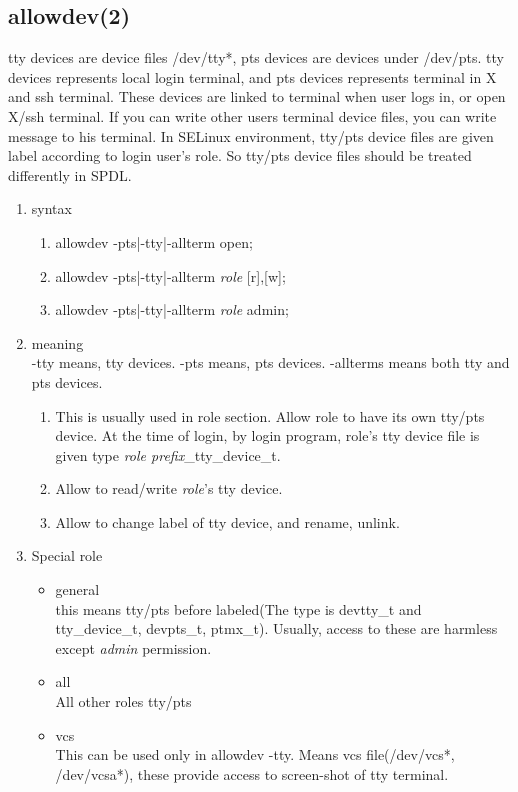 \documentclass{article}
\begin{document}
\subsection{allowdev(2)}
tty devices are device files /dev/tty*, pts devices are devices under
/dev/pts. tty devices represents local login terminal, and pts devices
represents terminal in X and ssh terminal. These devices are linked to
terminal when user logs in, or open X/ssh terminal. If you can write
other users terminal device files, you can write message to his
terminal. 
In SELinux environment, tty/pts device files are given label according to
login user's role. 
So tty/pts device files should be treated differently in SPDL.

\begin{enumerate}
 \item syntax
      \begin{enumerate}
       \item allowdev -pts|-tty|-allterm open;
       \item allowdev -pts|-tty|-allterm {\it role} [r],[w];  
       \item allowdev -pts|-tty|-allterm {\it role} admin;
      \end{enumerate}
 \item meaning\\
       -tty means, tty devices. -pts means, pts devices. -allterms means
       both tty and pts devices.
       \begin{enumerate}
	\item This is usually used in role section. Allow role to have
	      its own tty/pts device. At the time of login, by login
	      program, role's tty device file is given type {\it {\it role prefix}}\_tty\_device\_t. 
	\item  Allow to read/write {\it {\it role}}'s tty
	      device. 
	\item Allow to change label of tty device, and rename, unlink.
       \end{enumerate}
       \item Special role\\
       \begin{itemize}
	\item general\\
	      this means tty/pts before labeled(The type is devtty\_t
	      and tty\_device\_t, devpts\_t, ptmx\_t). Usually, access
	      to these are harmless except {\it admin } permission.
	\item all\\
	      All other roles tty/pts
	\item vcs\\
	      This can be used only in allowdev -tty. Means vcs file(/dev/vcs*, /dev/vcsa*), these provide access to screen-shot of tty terminal. 
       \end{itemize}

\end{enumerate}
\end{document}
